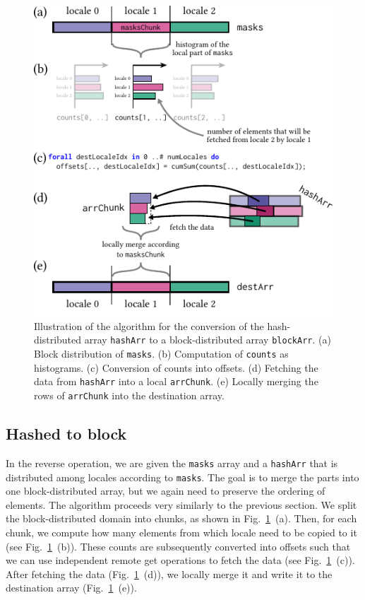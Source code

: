 \begin{figure}[h]
    \centering
    \includegraphics[width=0.7\linewidth]{./chapters/Proceedings_PAW_ATM_2023/algo-arrFromHashedToBlock.pdf}
    \cprotect\caption{Illustration of the algorithm for the conversion of the hash-distributed array \verb|hashArr| to a block-distributed array \verb|blockArr|.
    (a) Block distribution of \verb|masks|.
    (b) Computation of \verb|counts| as histograms.
    (c) Conversion of counts into offsets.
    (d) Fetching the data from \verb|hashArr| into a local \verb|arrChunk|.
    (e) Locally merging the rows of \verb|arrChunk| into the destination array.}
    \label{fig:ls23:algo:arrFromHashedToBlock}
\end{figure}


\subsection{Hashed to block}

In the reverse operation, we are given the \verb|masks| array and a \verb|hashArr| that is distributed among locales according to \verb|masks|. The goal is to merge the parts into one block-distributed array, but we again need to preserve the ordering of elements. The algorithm proceeds very similarly to the previous section. We split the block-distributed domain into chunks, as shown in Fig.~\ref{fig:ls23:algo:arrFromHashedToBlock}~(a). Then, for each chunk, we compute how many elements from which locale need to be copied to it (see Fig.~\ref{fig:ls23:algo:arrFromHashedToBlock}~(b)). These counts are subsequently converted into offsets such that we can use independent remote get operations to fetch the data (see Fig.~\ref{fig:ls23:algo:arrFromHashedToBlock}~(c)). After fetching the data (Fig.~\ref{fig:ls23:algo:arrFromHashedToBlock}~(d)), we locally merge it and write it to the destination array (Fig.~\ref{fig:ls23:algo:arrFromHashedToBlock}~(e)).

